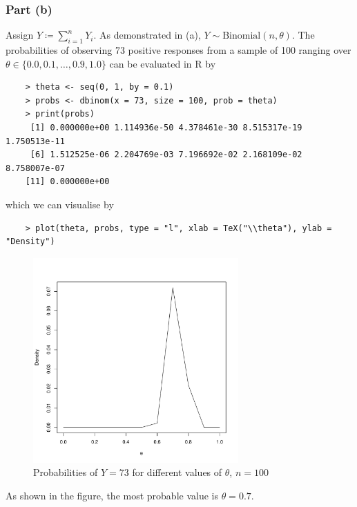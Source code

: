\documentclass{report}
\begin{document}
\subsubsection*{Part (b)}
Assign $Y \coloneqq \sum_{i = 1}^n Y_i$. As demonstrated in (a), $Y \sim \text{Binomial}(n, \theta)$. The probabilities of observing 73 positive responses from a sample of 100 ranging over $\theta \in \{0.0, 0.1, \ldots, 0.9, 1.0\}$ can be evaluated in \textsf{R} by
\begin{verbatim}
    > theta <- seq(0, 1, by = 0.1)
    > probs <- dbinom(x = 73, size = 100, prob = theta)
    > print(probs)
     [1] 0.000000e+00 1.114936e-50 4.378461e-30 8.515317e-19 1.750513e-11
     [6] 1.512525e-06 2.204769e-03 7.196692e-02 2.168109e-02 8.758007e-07
    [11] 0.000000e+00
\end{verbatim}
which we can visualise by
\begin{verbatim}
    > plot(theta, probs, type = "l", xlab = TeX("\\theta"), ylab = "Density")
\end{verbatim}
\vspace*{-1cm}
\begin{figure}[H]
    \centering
    \includegraphics[width=0.7\textwidth]{binom_plot_conditional.pdf}
    \caption{Probabilities of $Y = 73$ for different values of $\theta$, $n = 100$}
    \label{fig:binom_plot_condifitional}
\end{figure}
As shown in the figure, the most probable value is $\theta = 0.7$.
\end{document}
